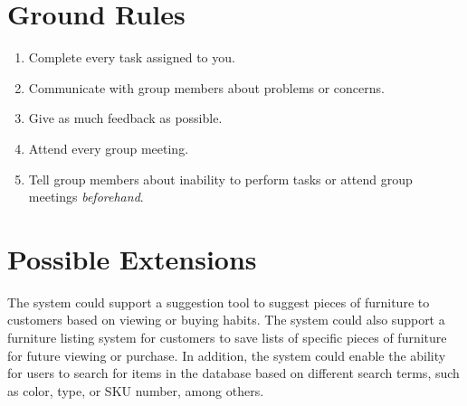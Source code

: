 \documentclass[american,extrafontsizes,12pt,portrait,letterpaper,oneside,onecolumn,article,final]{memoir}
\begin{document}
\section*{Ground Rules}
\begin{samepage}
\begin{enumerate}[leftmargin=*]
\item Complete every task assigned to you.
\item Communicate with group members about problems or concerns.
\item Give as much feedback as possible.
\item Attend every group meeting.
\item Tell group members about inability to perform tasks or attend group meetings \emph{beforehand}.
\end{enumerate}
\end{samepage}

\section*{Possible Extensions}
The system could support a suggestion tool to suggest pieces of furniture to customers based on viewing or buying habits.
The system could also support a furniture listing system for customers to save lists of specific pieces of furniture for future viewing or purchase.
In addition, the system could enable the ability for users to search for items in the database based on different search terms, such as color, type, or SKU number, among others.
\end{document}

